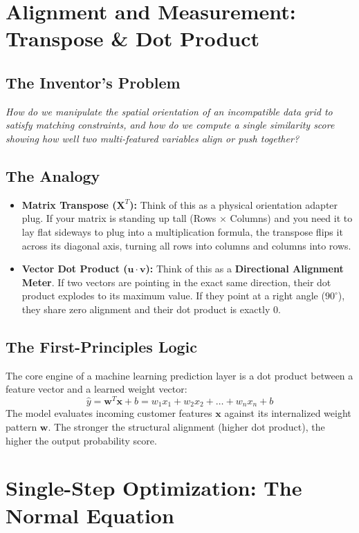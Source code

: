 \documentclass[12pt,a4paper]{article}
\begin{document}
\section{Alignment and Measurement: Transpose \& Dot Product}
\subsection*{The Inventor's Problem}
\textit{How do we manipulate the spatial orientation of an incompatible data grid to satisfy matching constraints, and how do we compute a single similarity score showing how well two multi-featured variables align or push together?}

\subsection*{The Analogy}
\begin{itemize}
    \item \textbf{Matrix Transpose ($\mathbf{X}^T$):} Think of this as a physical orientation adapter plug. If your matrix is standing up tall (Rows $\times$ Columns) and you need it to lay flat sideways to plug into a multiplication formula, the transpose flips it across its diagonal axis, turning all rows into columns and columns into rows.
    \item \textbf{Vector Dot Product ($\mathbf{u} \cdot \mathbf{v}$):} Think of this as a \textbf{Directional Alignment Meter}. If two vectors are pointing in the exact same direction, their dot product explodes to its maximum value. If they point at a right angle ($90^\circ$), they share zero alignment and their dot product is exactly 0.
\end{itemize}

\subsection*{The First-Principles Logic}
The core engine of a machine learning prediction layer is a dot product between a feature vector and a learned weight vector:
$$\hat{y} = \mathbf{w}^T \mathbf{x} + b = w_1x_1 + w_2x_2 + \dots + w_nx_n + b$$
The model evaluates incoming customer features $\mathbf{x}$ against its internalized weight pattern $\mathbf{w}$. The stronger the structural alignment (higher dot product), the higher the output probability score.

\newpage
\section{Single-Step Optimization: The Normal Equation}
\end{document}
